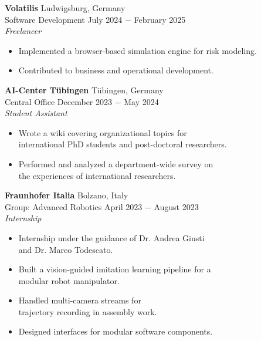 \documentclass{article}
\begin{document}
\noindent \textbf{Volatilis}  \hfill Ludwigsburg, Germany \\
\noindent Software Development \hfill July 2024 $-$ February 2025\\
\textit{Freelancer}
\begin{itemize}[noitemsep,nolistsep,leftmargin=*]
    \item Implemented a browser-based simulation engine for risk modeling.
    \item Contributed to business and operational development. \\
\end{itemize}

\noindent \textbf{AI-Center Tübingen}  \hfill Tübingen, Germany \\
\noindent Central Office  \hfill December 2023 $-$ May 2024 \\
\textit{Student Assistant}
\begin{itemize}[noitemsep,nolistsep,leftmargin=*]
    \item Wrote a wiki covering organizational topics for \\
    international PhD students and post-doctoral researchers.
    \item Performed and analyzed a department-wide survey on \\ the experiences of international researchers.\\
\end{itemize}

\noindent \textbf{Fraunhofer Italia}  \hfill Bolzano, Italy \\
\noindent Group: Advanced Robotics  \hfill April 2023 $-$ August 2023 \\
\textit{Internship}
\begin{itemize}[noitemsep,nolistsep,leftmargin=*]
    \item Internship under the guidance of Dr. Andrea Giusti \\ and Dr. Marco Todescato.
    \item Built a vision-guided imitation learning pipeline for a \\ modular robot manipulator.
    \item Handled multi-camera streams for \\trajectory recording in assembly work.
    \item Designed interfaces for modular software components. \\
\end{itemize}
\end{document}
